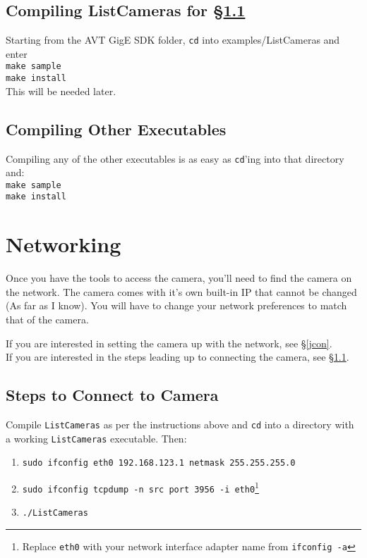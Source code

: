 \documentclass[10pt]{scrartcl}
\begin{document}
\subsection{Compiling ListCameras for \S\ref{hto}}
Starting from the AVT GigE SDK folder, \texttt{cd} into examples/ListCameras and enter\\
\texttt{make sample}\\
\texttt{make install}\\

This will be needed later.

\subsection{Compiling Other Executables}
Compiling any of the other executables is as easy as \texttt{cd}'ing into that directory and:\\
\texttt{make sample}\\
\texttt{make install}

\section{Networking}
Once you have the tools to access the camera, you'll need to find the camera on the network. The camera comes with it's own built-in IP that cannot be changed (As far as I know). You will have to change your network preferences to match that of the camera. 

If you are interested in setting the camera up with the network, see \S\ref{jcon}.\\
If you are interested in the steps leading up to connecting the camera, see \S\ref{hto}.


\subsection{Steps to Connect to Camera}\label{hto}
Compile \texttt{ListCameras} as per the instructions above and \texttt{cd} into a directory with a working \texttt{ListCameras} executable. Then:\\
\begin{enumerate}
\item \texttt{sudo ifconfig eth0 192.168.123.1 netmask 255.255.255.0}
\item \texttt{sudo ifconfig tcpdump -n src port 3956 -i eth0}\footnote{Replace \texttt{eth0} with your network interface adapter name from \texttt{ifconfig -a}}
\item \texttt{./ListCameras}
\end{enumerate}
\end{document}
